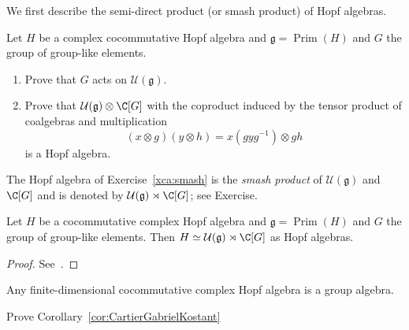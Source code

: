 \documentclass[12pt]{amsproc}
\begin{document}
We first describe 
the semi-direct product (or smash product) 
of Hopf algebras. 


\begin{exercise}
\label{xca:smash}
Let $H$ be a complex cocommutative Hopf algebra and 
$\mathfrak{g}=\operatorname{Prim}(H)$ and 
$G$ the group 
of group-like elements.  
\begin{enumerate}
    \item Prove that $G$ acts on $\mathcal{U}(\mathfrak{g})$.    
    \item Prove that $\mathcal{U}(\mathfrak{g})\otimes\C[G]$ 
    with the coproduct induced by the tensor product of 
    coalgebras and multiplication
    \[
    (x\otimes g)(y\otimes h)=x(gyg^{-1})\otimes gh
    \]
    is a Hopf algebra. 
\end{enumerate}
\end{exercise}

The Hopf algebra of Exercise~\ref{xca:smash} is 
the \emph{smash product} of 
$\mathcal{U}(\mathfrak{g})$ and $\C[G]$
and is denoted by $\mathcal{U}(\mathfrak{g})\rtimes\C[G]$; see Exercise.%

\begin{theorem}
    \label{thm:CartierGabrielKostant}
    Let $H$ be a cocommutative complex Hopf algebra 
    and $\mathfrak{g}=\operatorname{Prim}(H)$ and $G$ 
    the group of group-like elements. Then 
    $H\simeq\mathcal{U}(\mathfrak{g})\rtimes\C[G]$ as 
    Hopf algebras. 
\end{theorem}

\begin{proof}
    See~\cite[Theorem 4.5.1]{zbMATH07372929}. 
\end{proof}


\begin{corollary}
\label{cor:CartierGabrielKostant}
    Any finite-dimensional cocommutative complex Hopf algebra
    is a group algebra. 
\end{corollary}

\begin{exercise}
    Prove Corollary~\ref{cor:CartierGabrielKostant}
\end{exercise}
\end{document}
